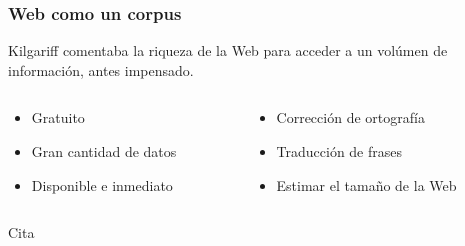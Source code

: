 
\begin{frame}[t]\frametitle{Web como un corpus}
    Kilgariff comentaba la riqueza de la Web para acceder a un volúmen de información, antes impensado.

\bigskip
\begin{columns}
    \begin{column}{0.5\textwidth}
        \begin{itemize}
            \item Gratuito
            \item Gran cantidad de datos
            \item Disponible e inmediato
        \end{itemize}
    \end{column}
    \begin{column}{0.5\textwidth}
        \begin{itemize}
            \item Corrección de ortografía
            \item Traducción de frases
            \item Estimar el tamaño de la Web
        \end{itemize}
    \end{column}
\end{columns}

\bigskip
\begin{block}{Cita}
\end{block}

\end{frame}